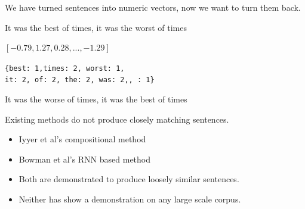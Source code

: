 \documentclass[]{beamer}
\newcommand{\iitem}[1]{\begin{itemize}
		\item #1
	\end{itemize}}
\begin{document}
\begin{frame}{We have turned sentences into numeric vectors, now we want to turn them back.}

	\begin{description}
		\item<1->[Sentence:] It was the best of times, it was the worst of times
		\item<2->[Vector representation:]  $[−0.79, 1.27, 0.28, ..., −1.29]$
		\item<3->[BOW output:] \texttt{\{best: 1,times: 2, worst: 1, \\it: 2, of: 2, the: 2, was: 2,, : 1\}}
		\vfill
		\item<4->[Sentence:] It was the worse of times, it was the best of times
	\end{description}
\end{frame}



\begin{frame}{Existing methods do not produce closely matching sentences.}
	\begin{itemize}
		\vfill
		\item Iyyer et al's compositional method
		\item Bowman et al's RNN based method
		\vfill
		\item<2-> Both are demonstrated to produce loosely similar sentences.
		\item<3-> Neither has show a demonstration on any large scale corpus.
		\vfill
	\end{itemize}
	
\end{frame}
\end{document}
